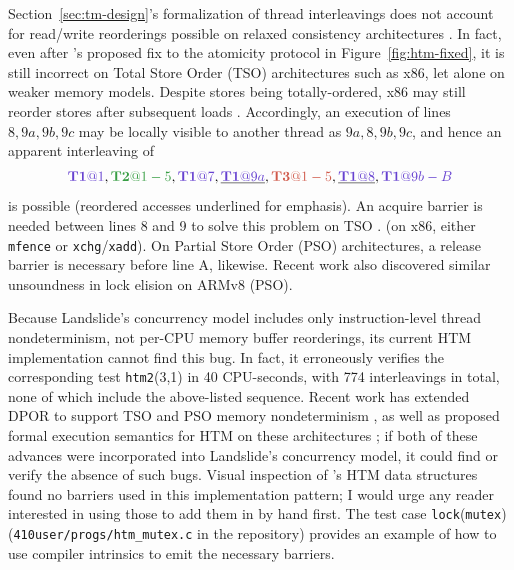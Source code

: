 Section~\ref{sec:tm-design}'s formalization of thread interleavings does not account for read/write reorderings
possible on relaxed consistency architectures \cite{memory-consistency-models}.
In fact,
even after \cite{tm-benchmark-cmu}'s proposed fix to the atomicity protocol in Figure~\ref{fig:htm-fixed},
it is still incorrect on Total Store Order (TSO) architectures such as x86,
let alone on weaker memory models.
Despite stores being totally-ordered, x86 may still reorder stores after subsequent loads
\cite{sully-thesis}.
Accordingly, an execution of lines $8,9a,9b,9c$
may be locally visible to another thread as $9a,8,9b,9c$,
and hence an apparent interleaving of
\[
        \tiat{1},\tjat{1-5},\tiat{7},\underline{\tiat{9a}},\tkat{1-5},\underline{\tiat{8}},\tiat{9b-B}
\]
is possible
(reordered accesses underlined for emphasis).
An acquire barrier is needed between lines 8 and 9 to solve this problem on TSO \cite{tsx-need-barrier}.
(on x86, either {\tt mfence} or {\tt xchg}/{\tt xadd}).
On Partial Store Order (PSO) architectures,
a release barrier is necessary before line A, likewise.
Recent work \cite{relaxed-transactions-pldi} also discovered similar unsoundness in lock elision on ARMv8 (PSO).

Because Landslide's concurrency model includes only instruction-level thread nondeterminism,
not per-CPU memory buffer reorderings,
its current HTM implementation cannot find this bug.
In fact, it erroneously verifies the corresponding test {\tt htm2}(3,1)
in 40 CPU-seconds,
with 774 interleavings in total,
none of which include the above-listed sequence.
Recent work has extended DPOR to support TSO and PSO memory nondeterminism \cite{tsopso},
as well as proposed formal execution semantics for HTM on these architectures
\cite{relaxed-transactions-popl,relaxed-transactions-pldi};
if both of these advances were incorporated into Landslide's concurrency model,
it could find or verify the absence of such bugs.
Visual inspection of \cite{tm-benchmark-cmu}'s HTM data structures found no barriers used in this implementation pattern;
I would urge any reader interested in using those to add them in by hand first.
The test case {\tt lock}({\tt mutex}) ({\tt 410user/progs/htm\_mutex.c} in the repository)
provides an example of how to use compiler intrinsics to emit the necessary barriers.
